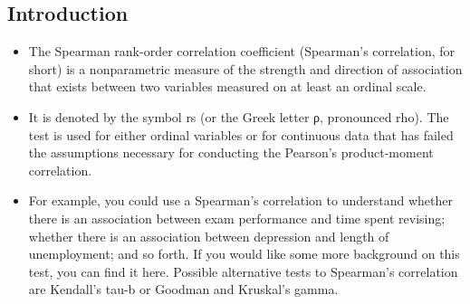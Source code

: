 \documentclass[]{article}
\begin{document}
\subsection{Introduction}
\begin{itemize}
	\item The Spearman rank-order correlation coefficient (Spearman’s correlation, for short) is a nonparametric measure of the strength and direction of association that exists between two variables measured on at least an ordinal scale. 
	\item It is denoted by the symbol rs (or the Greek letter ρ, pronounced rho). The test is used for either ordinal variables or for continuous data that has failed the assumptions necessary for conducting the Pearson's product-moment correlation.
	\item  For example, you could use a Spearman’s correlation to understand whether there is an association between exam performance and time spent revising; whether there is an association between depression and length of unemployment; and so forth. If you would like some more background on this test, you can find it here. Possible alternative tests to Spearman's correlation are Kendall's tau-b or Goodman and Kruskal's gamma.
\end{itemize}
\end{document}
